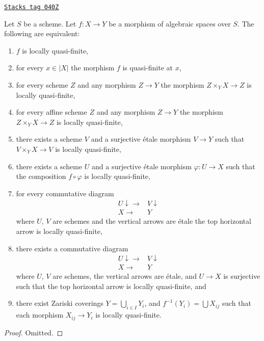 \begin{lemma}
\label{spaces-morphisms-lemma-quasi-finite-local}
\href{https://stacks.math.columbia.edu/tag/040Z}{\texttt{Stacks tag 040Z}}

Let $S$ be a scheme.
Let $f : X \to Y$ be a morphism of algebraic spaces over $S$.
The following are equivalent:
\begin{enumerate}
\item $f$ is locally quasi-finite,
\item for every $x \in |X|$ the morphism $f$ is quasi-finite at $x$,
\item for every scheme $Z$ and any morphism $Z \to Y$ the morphism
$Z \times_Y X \to Z$ is locally quasi-finite,
\item for every affine scheme $Z$ and any morphism
$Z \to Y$ the morphism $Z \times_Y X \to Z$ is locally quasi-finite,
\item there exists a scheme $V$ and a surjective \'etale morphism
$V \to Y$ such that $V \times_Y X \to V$ is locally quasi-finite,
\item there exists a scheme $U$ and a surjective \'etale morphism
$\varphi : U \to X$ such that the composition $f \circ \varphi$
is locally quasi-finite,
\item for every commutative diagram
$$
\begin{array}{cc}U \downarrow\longrightarrow & V \downarrow \\ X \longrightarrow & Y\end{array}
$$
where $U$, $V$ are schemes and the vertical arrows are \'etale
the top horizontal arrow is locally quasi-finite,
\item there exists a commutative diagram
$$
\begin{array}{cc}U \downarrow\longrightarrow & V \downarrow \\ X \longrightarrow & Y\end{array}
$$
where $U$, $V$ are schemes, the vertical arrows are \'etale, and
$U \to X$ is surjective such that the top horizontal arrow is
locally quasi-finite, and
\item there exist Zariski coverings $Y = \bigcup_{i \in I} Y_i$,
and $f^{-1}(Y_i) = \bigcup X_{ij}$ such that
each morphism $X_{ij} \to Y_i$ is locally quasi-finite.
\end{enumerate}
\end{lemma}

\begin{proof}
Omitted.
\end{proof}

